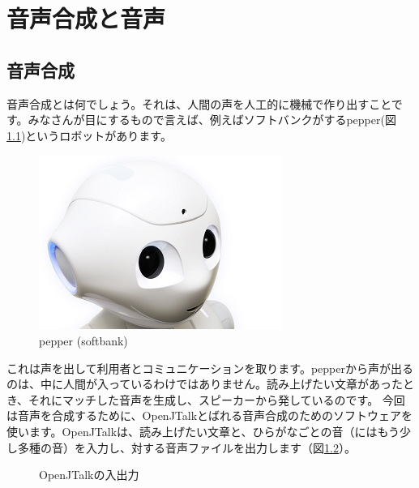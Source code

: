 \chapter{音声合成と音声}
\section{音声合成}
音声合成とは何でしょう。それは、人間の声を人工的に機械で作り出すことです。みなさんが目にするもので言えば、例えばソフトバンクがするpepper(図\ref{pepper})というロボットがあります。

\begin{figure}[H]
\begin{center}
    \includegraphics[width=0.5\linewidth]{images/chap06/text06-img001.jpg}
    \caption{pepper (softbank)}
    \label{pepper}
\end{center}
\end{figure}

これは声を出して利用者とコミュニケーションを取ります。pepperから声が出るのは、中に人間が入っているわけではありません。読み上げたい文章があったとき、それにマッチした音声を生成し、スピーカーから発しているのです。
今回は音声を合成するために、OpenJTalkとばれる音声合成のためのソフトウェアを使います。OpenJTalkは、読み上げたい文章と、ひらがなごとの音（にはもう少し多種の音）を入力し、対する音声ファイルを出力します（図\ref{OpenJTalkの入出力}）。

\begin{figure}[H]
\begin{center}
    
    \caption{OpenJTalkの入出力}
    \label{OpenJTalkの入出力}
\end{center}
\end{figure}

\begin{tcolorbox}[title=\useOmetoi]
\begin{enumerate}
\end{enumerate}
\end{tcolorbox}
